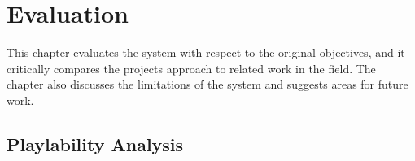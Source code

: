 \chapter{Evaluation}
\label{chapter:evaluation}

This chapter evaluates the system with respect to the original objectives, and it critically compares the projects approach to related work in the field. The chapter also discusses the limitations of the system and suggests areas for future work.

\section{Playlability Analysis}
\label{sec:playability-analysis}






